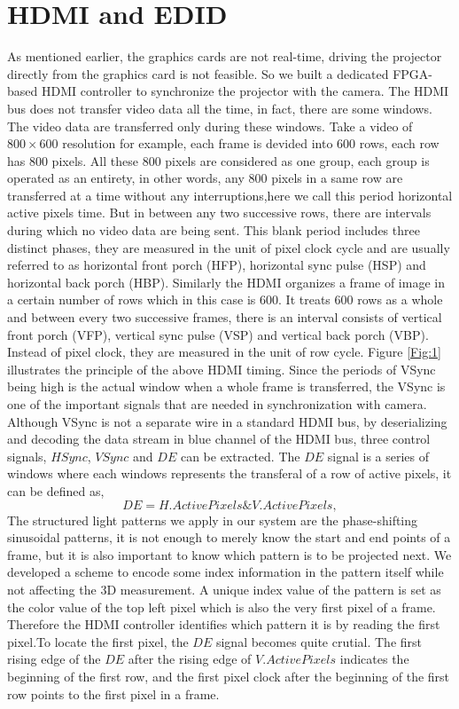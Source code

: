 \documentclass[]{spie}  %
\begin{document}
\section{HDMI and EDID}
As mentioned earlier, the graphics cards are not real-time, driving the projector directly from the graphics card is not feasible. So we built a dedicated FPGA-based HDMI controller to synchronize the projector with the camera. The HDMI bus does not transfer video data all the time, in fact, there are some windows. The video data are transferred only during these windows. Take a video of $800 \times 600$ resolution for example, each frame is devided into 600 rows,  each row has 800 pixels. All these 800 pixels are considered as one group, each group is operated as an entirety, in other words, any 800 pixels in a same row are transferred at a time without any interruptions,here we call this period horizontal active pixels time. But in between any two successive rows, there are intervals during which no video data are being sent. This blank period includes three distinct phases, they are measured in the unit of pixel clock cycle and are usually referred to as horizontal front porch (HFP), horizontal sync pulse (HSP) and horizontal back porch (HBP). Similarly the HDMI organizes a frame of image in a certain number of rows which in this case is 600. It treats 600 rows as a whole and between every two successive frames, there is an interval consists of vertical front porch (VFP), vertical sync pulse (VSP) and vertical back porch (VBP). Instead of pixel clock, they are measured in the unit of row cycle.  Figure \ref{Fig:1} illustrates the principle of the above HDMI timing.
Since the periods of VSync being high is the actual window when a whole frame is transferred, the VSync is one of the important signals that are needed in synchronization with camera. Although VSync is not a separate wire in a standard HDMI bus, by deserializing and decoding the data stream in blue channel of the HDMI bus, three control signals,  $HSync$, $VSync$ and $DE$ can be extracted. The $DE$ signal is a series of windows where each windows represents the transferal of a row of active pixels, it can be defined as, 
 \begin{equation} \label{}
  	DE = H.Active Pixels \& V. Active Pixels,
  \end{equation}
The structured light patterns we apply in our system are the phase-shifting sinusoidal patterns, it is not enough to merely know the start and end points of a frame, but it is also important to know which pattern is to be projected next. We developed a scheme to encode some index information in the pattern itself while not  affecting the 3D measurement. A unique index value of the pattern is set as the color value of the top left pixel which is also the very first pixel of a frame. Therefore the HDMI controller identifies which pattern it is by reading the first pixel.To locate the first pixel, the $DE$ signal becomes quite crutial. The first rising edge of the $DE$ after the rising edge of $V.Active Pixels$ indicates the beginning of the first row, and the first pixel clock after the beginning of the first row points to the first pixel in a frame.
\end{document}
